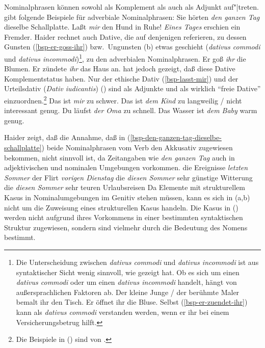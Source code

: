 Nominalphrasen können sowohl als Komplement als auch als Adjunkt
auf"|treten. \citet*{Haider85b} gibt folgende 
Beispiele für adverbiale Nominalphrasen:
\eal
\ex Sie hörten \emph{den ganzen Tag} dieselbe Schallplatte.\label{bsp-den-ganzen-tag-dieselbe-schallplatte}
\ex Laßt \emph{mir} den Hund in Ruhe!\label{bsp-lasst-mir}
\ex \emph{Eines Tages} erschien ein Fremder.
\zl
Haider rechnet auch Dative, die auf denjenigen referieren, zu dessen Gunsten (\ref{bsp-er-goss-ihr})
bzw.\ Ungunsten (b) etwas geschieht (\textit{dativus commodi} und \textit{dativus incommodi})\footnote{\label{fn-dativ-commodi}%
        Die Unterscheidung zwischen \textit{dativus commodi} und \textit{dativus incommodi}
        ist aus syntaktischer Sicht wenig sinnvoll, wie \citet*[]{Wegener85b}
        gezeigt hat.
        Ob es sich um einen \textit{dativus commodi} oder um einen \textit{dativus incommodi} handelt,
        hängt von außersprachlichen Faktoren ab.
        \eal
        \ex Der kleine Junge / der berühmte Maler bemalt ihr den Tisch.
        \ex Er öffnet ihr die Bluse.
        \zl
        Selbst (\ref{bsp-er-zuendet-ihr}) kann als \textit{dativus commodi} verstanden werden, wenn
        er ihr bei einem Versicherungsbetrug hilft.%
}, zu den adverbialen Nominalphrasen.
\eal
\ex Er goß \emph{ihr} die Blumen.\label{bsp-er-goss-ihr}
\ex Er zündete \emph{ihr} das Haus an.\label{bsp-er-zuendet-ihr}
\zl
\citet*{Wegener85b} hat jedoch gezeigt, daß diese Dative Komplementstatus haben.
Nur der ethische Dativ (\ref{bsp-lasst-mir}) und der Urteilsdativ (\textit{Dativ iudicantis}) ()
sind als Adjunkte und als wirklich "`freie Dative"' einzuordnen.\footnote{
        Die Beispiele in () sind von \citet*[]{Wegener85b}.
}
\eal
\ex Das ist \emph{mir} zu schwer.
\ex Das ist \emph{dem Kind} zu langweilig / nicht interessant genug.
\ex Du läufst \emph{der Oma} zu schnell.
\ex Das Wasser ist \emph{dem Baby} warm genug.
\zl

\noindent
Haider zeigt, daß die Annahme, daß in (\ref{bsp-den-ganzen-tag-dieselbe-schallplatte}) beide
Nominalphrasen vom Verb den Akkusativ zugewiesen bekommen,
nicht sinnvoll ist, da Zeitangaben wie \emph{den ganzen Tag} auch in adjektivischen und
nominalen Umgebungen vorkommen.
\eal
\ex die Ereignisse \emph{letzten Sommer}
\ex der Flirt \emph{vorigen Dienstag}
\ex die \emph{diesen Sommer} sehr günstige Witterung
\ex die \emph{diesen Sommer} sehr teuren Urlaubsreisen
\zl
Da Elemente mit strukturellem Kasus in Nominalumgebungen
im Genitiv stehen müssen, kann es sich in (a,b)
nicht um die Zuweisung eines strukturellen Kasus handeln.
%
Die Kasus in () werden nicht aufgrund ihres Vorkommens in einer bestimmten
syntaktischen Struktur zugewiesen, sondern sind vielmehr durch die Bedeutung des Nomens bestimmt.

